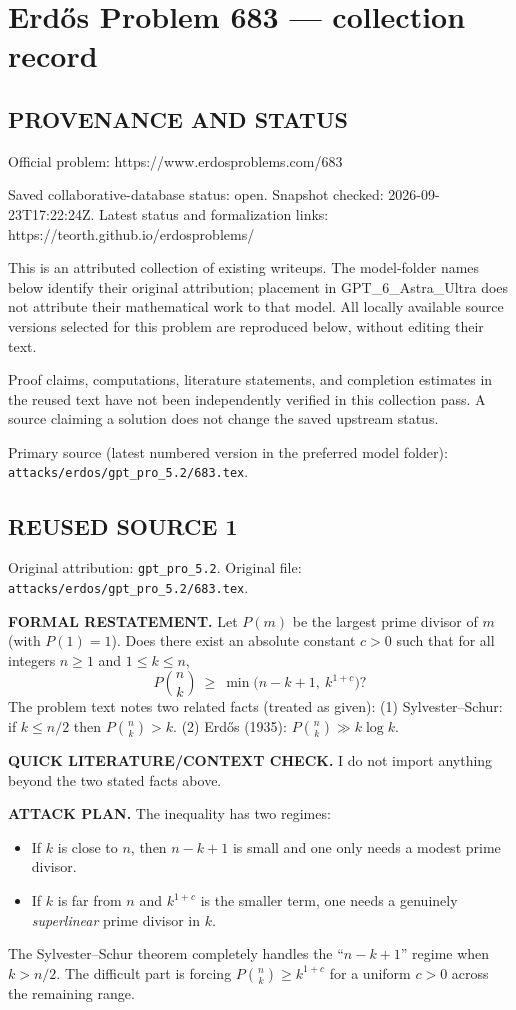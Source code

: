 \section*{Erd\H{o}s Problem 683 --- collection record}

\subsection*{PROVENANCE AND STATUS}
Official problem: https://www.erdosproblems.com/683

Saved collaborative-database status: open.
Snapshot checked: 2026-09-23T17:22:24Z.
Latest status and formalization links: https://teorth.github.io/erdosproblems/

This is an attributed collection of existing writeups. The model-folder names below identify their original attribution; placement in GPT\_6\_Astra\_Ultra does not attribute their mathematical work to that model. All locally available source versions selected for this problem are reproduced below, without editing their text.

Proof claims, computations, literature statements, and completion estimates in the reused text have not been independently verified in this collection pass. A source claiming a solution does not change the saved upstream status.

Primary source (latest numbered version in the preferred model folder): \texttt{attacks/erdos/gpt\_pro\_5.2/683.tex}.

\subsection*{REUSED SOURCE 1}
Original attribution: \texttt{gpt\_pro\_5.2}.
Original file: \texttt{attacks/erdos/gpt\_pro\_5.2/683.tex}.

\item
\textbf{FORMAL RESTATEMENT.}
Let $P(m)$ be the largest prime divisor of $m$ (with $P(1)=1$).
Does there exist an absolute constant $c>0$ such that for all integers $n\ge1$ and $1\le k\le n$,
\[
P\!\binom{n}{k}\ \ge\ \min\bigl(n-k+1,\ k^{1+c}\bigr)?
\]
The problem text notes two related facts (treated as given):
(1) Sylvester--Schur: if $k\le n/2$ then $P\!\binom{n}{k}>k$.
(2) Erd\H{o}s (1935): $P\!\binom{n}{k} \gg k\log k$.

\textbf{QUICK LITERATURE/CONTEXT CHECK.}
I do not import anything beyond the two stated facts above.

\textbf{ATTACK PLAN.}
The inequality has two regimes:
\begin{itemize}
\item If $k$ is close to $n$, then $n-k+1$ is small and one only needs a modest prime divisor.
\item If $k$ is far from $n$ and $k^{1+c}$ is the smaller term, one needs a genuinely \emph{superlinear} prime divisor in $k$.
\end{itemize}
The Sylvester--Schur theorem completely handles the ``$n-k+1$'' regime when $k>n/2$. The difficult part is forcing $P\!\binom{n}{k} \ge k^{1+c}$ for a uniform $c>0$ across the remaining range.

